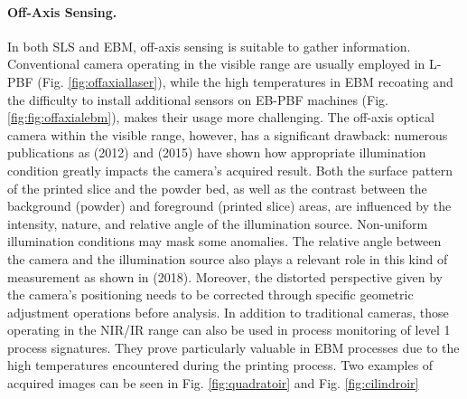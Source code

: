 \paragraph{Off-Axis Sensing.} In both SLS and EBM, off-axis sensing is suitable to gather information. Conventional camera operating in the visible range are usually employed in L-PBF (Fig. \ref{fig:offaxiallaser}), while the high temperatures in EBM recoating and the difficulty to install additional sensors on EB-PBF machines (Fig. \ref{fig:fig:offaxialebm}), makes their usage more challenging. The off-axis optical camera within the visible range, however, has a significant drawback: numerous publications as \citealt{kleszczynski_error_2012} (2012) and \citeauthor{foster_bk_optical_2015} (2015) have shown how appropriate illumination condition greatly impacts the camera's acquired result. Both the surface pattern of the printed slice and the powder bed, as well as the contrast between the background (powder) and foreground (printed slice) areas, are influenced by the intensity, nature, and relative angle of the illumination source. Non-uniform illumination conditions may mask some anomalies. The relative angle between the camera and the illumination source also plays a relevant role in this kind of measurement as shown in  \citeauthor{caltanissetta_characterization_2018} (2018). Moreover, the distorted perspective given by the camera's positioning needs to be corrected through specific geometric adjustment operations before analysis. In addition to traditional cameras, those operating in the NIR/IR range can also be used in process monitoring of level 1 process signatures. They prove particularly valuable in EBM processes due to the high temperatures encountered during the printing process. Two examples of acquired images can be seen in Fig. \ref{fig:quadratoir} and Fig. \ref{fig:cilindroir}
